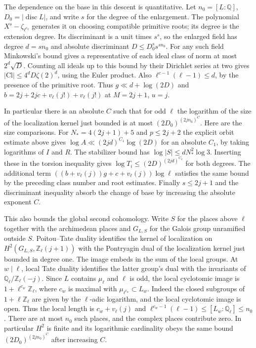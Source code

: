 \documentclass[11pt]{amsart}
\theoremstyle{definition}
\theoremstyle{remark}
\begin{document}
The dependence on the base in this descent is quantitative.
Let $n_0=[L:\mathbb Q]$, $D_0=|\operatorname{disc}L|$, and write
$s$ for the degree of the enlargement. The polynomial
$X^s-\zeta_{\ell^{c_0}}$ generates it on choosing compatible primitive
roots; its degree is the extension degree. Its discriminant is a
unit times $s^s$, so the enlarged field has degree $d=sn_0$ and
absolute discriminant $D\le D_0^s s^{sn_0}$. For any such field
Minkowski's bound gives a representative of each ideal class of norm
at most $2^d\sqrt D$. Counting all ideals up to this bound by their
Dirichlet series at two gives
$|\mathrm{Cl}|\le4^dD\zeta(2)^d$, using the Euler product.
Also $\ell^{c-1}(\ell-1)\le d$, by the presence of the primitive
root. Thus $g\ll d+\log(2D)$ and
$b=2j+2jc+v_\ell(j!)+v_\ell(j!)$ at $M=2j+1$, $u=j$.

In particular there is an absolute $C$ such that for odd $\ell$ the
logarithm of the size of the localization kernel just bounded is at
most $(2D_0)^{(2jn_0)^C}$. Here are the size comparisons. For
$N_*=4(2j+1)+5$ and $p\le2j+2$ the explicit orbit estimate above
gives $\log A\ll (2jd)^{C_1}\log(2D)$ for an absolute $C_1$,
by taking logarithms of $I$ and $R$. The stabilizer bound has
$\log |S|\le dN_*^2\log3$. Inserting these in the torsion
inequality gives $\log T_i\le (2D)^{(2jd)^{C_2}}$ for both degrees.
The additional term $((b+v_\ell(j))g+c+v_\ell(j))\log\ell$
satisfies the same bound by the preceding class number and root
estimates. Finally $s\le2j+1$ and the discriminant inequality
absorb the change of base by increasing the absolute exponent $C$.

This also bounds the global second cohomology. Write $S$ for the
places above $\ell$ together with the archimedean places and
$G_{L,S}$ for the Galois group unramified outside $S$.
Poitou--Tate duality identifies the kernel of localization on
$H^2(G_{L,S},\mathbb Z_\ell(j+1))$ with the Pontryagin dual of the
localization kernel just bounded in degree one. The image embeds in
the sum of the local groups. At $w\mid\ell$, local Tate duality identifies
the latter group's dual with the invariants of
$\mathbb Q_\ell/\mathbb Z_\ell(-j)$. Since $L$ contains $\mu_\ell$
and $\ell$ is odd, the local cyclotomic image is $1+\ell^{c_w}\mathbb Z_\ell$,
where $c_w$ is maximal with $\mu_{\ell^{c_w}}\subset L_w$.
Indeed the closed subgroups of $1+\ell\mathbb Z_\ell$ are given by
the $\ell$-adic logarithm, and the local cyclotomic image is open.
Thus the local length is $c_w+v_\ell(j)$ and
$\ell^{c_w-1}(\ell-1)\le[L_w:\mathbb Q_\ell]\le n_0$.
There are at most $n_0$ such places, and the complex places contribute
zero. In particular $H^2$ is finite and its logarithmic cardinality
obeys the same bound $(2D_0)^{(2jn_0)^C}$ after increasing $C$.
\end{document}
